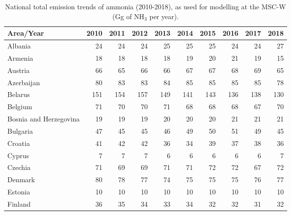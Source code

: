  \begin{table}
 \caption{National total emission trends of  ammonia (2010-2018), as used for modelling at the MSC-W (Gg of NH$_3$ per year).}
 
 \vspace{15pt}
 
 \scriptsize
 \centering
 \begin{tabular}{|l|r|r|r|r|r|r|r|r|r|}
 \hline
                     Area/Year&   2010&   2011&   2012&   2013&   2014&   2015&   2016&   2017&   2018\\\hline\hline
                       Albania&     24&     24&     24&     25&     25&     25&     24&     24&     27\\\hline
                       Armenia&     18&     18&     18&     18&     19&     20&     21&     19&     15\\\hline
                       Austria&     66&     65&     66&     66&     67&     67&     68&     69&     65\\\hline
                    Azerbaijan&     80&     83&     83&     84&     85&     85&     85&     85&     78\\\hline
                       Belarus&    151&    154&    157&    149&    141&    143&    136&    138&    130\\\hline
                       Belgium&     71&     70&     70&     71&     68&     68&     68&     67&     70\\\hline
        Bosnia and Herzegovina&     19&     19&     19&     20&     20&     20&     21&     21&     21\\\hline
                      Bulgaria&     47&     45&     45&     46&     49&     50&     51&     49&     45\\\hline
                       Croatia&     41&     42&     42&     36&     34&     39&     37&     38&     36\\\hline
                        Cyprus&      7&      7&      7&      6&      6&      6&      6&      6&      7\\\hline
                       Czechia&     71&     69&     69&     71&     71&     72&     72&     67&     72\\\hline
                       Denmark&     80&     78&     77&     74&     75&     75&     75&     76&     77\\\hline
                       Estonia&     10&     10&     10&     10&     10&     10&     10&     10&     10\\\hline
                       Finland&     36&     35&     34&     33&     34&     32&     32&     31&     32\\\hline

\end{tabular}
\end{table}
